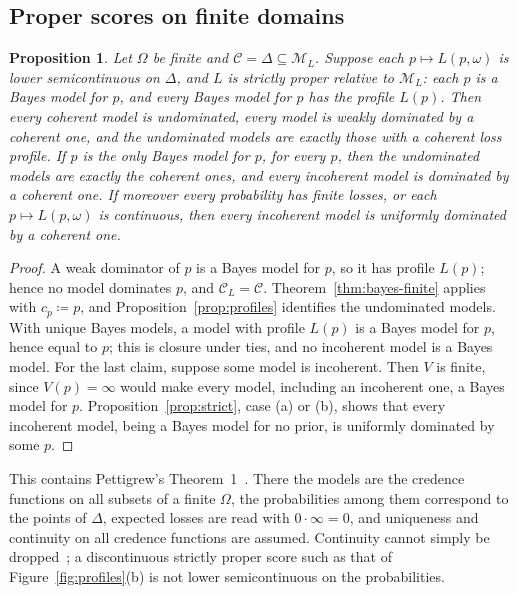 \documentclass[11pt]{article}
\newtheorem{proposition}[theorem]{Proposition}
\theoremstyle{definition}
\theoremstyle{remark}
\newcommand{\M}{\mathcal M}
\newcommand{\C}{\mathcal C}
\begin{document}
\subsection{Proper scores on finite domains}\label{sec:proper}
\begin{proposition}\label{prop:proper}
Let $\Omega$ be finite and $\C=\Delta\subseteq\M_L$. Suppose each $p\mapsto L(p,\omega)$ is lower semicontinuous on $\Delta$, and $L$ is \emph{strictly proper relative to $\M_L$}: each $p$ is a Bayes model for $p$, and every Bayes model for $p$ has the profile $L(p)$. Then every coherent model is undominated, every model is weakly dominated by a coherent one, and the undominated models are exactly those with a coherent loss profile. If $p$ is the only Bayes model for $p$, for every $p$, then the undominated models are exactly the coherent ones, and every incoherent model is dominated by a coherent one. If moreover every probability has finite losses, or each $p\mapsto L(p,\omega)$ is continuous, then every incoherent model is uniformly dominated by a coherent one.
\end{proposition}
\begin{proof}
A weak dominator of $p$ is a Bayes model for $p$, so it has profile $L(p)$; hence no model dominates $p$, and $\C_L=\C$. Theorem~\ref{thm:bayes-finite} applies with $c_p\coloneqq p$, and Proposition~\ref{prop:profiles} identifies the undominated models. With unique Bayes models, a model with profile $L(p)$ is a Bayes model for $p$, hence equal to $p$; this is closure under ties, and no incoherent model is a Bayes model. For the last claim, suppose some model is incoherent. Then $V$ is finite, since $V(p)=\infty$ would make every model, including an incoherent one, a Bayes model for $p$. Proposition~\ref{prop:strict}, case (a) or (b), shows that every incoherent model, being a Bayes model for no prior, is uniformly dominated by some $p$.
\end{proof}

This contains Pettigrew's Theorem~1~\cite{Pettigrew}. There the models are the credence functions on all subsets of a finite $\Omega$, the probabilities among them correspond to the points of $\Delta$, expected losses are read with $0\cdot\infty=0$, and uniqueness and continuity on all credence functions are assumed. Continuity cannot simply be dropped~\cite{SSK09}; a discontinuous strictly proper score such as that of Figure~\ref{fig:profiles}(b) is not lower semicontinuous on the probabilities.
\end{document}
